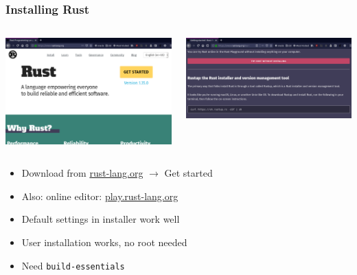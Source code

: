 \documentclass[aspectratio=169]{beamer}
\begin{document}
\begin{frame}
  \frametitle{Installing Rust}

  \begin{columns}
    \begin{column}{.4\linewidth}
      \includegraphics[width=\linewidth]{figs/screenshots/presentation-20190612-110530}
    \end{column}

    \begin{column}{.6\linewidth}
      \includegraphics[width=\linewidth]{figs/screenshots/presentation-20190612-110503}
    \end{column}
  \end{columns}

  \vspace{.5cm}
  \begin{itemize}
  \item Download from \href{rust-lang.org}{rust-lang.org} $\rightarrow$ Get started
  \item Also: online editor: \href{http://play.rust-lang.org}{play.rust-lang.org}
  \item Default settings in installer work well
  \item User installation works, no root needed
  \item Need \texttt{build-essentials}
  \end{itemize}
\end{frame}
\end{document}
